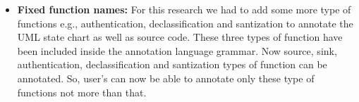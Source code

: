 \begin{itemize}
	\item \textbf{Fixed function names:} For this research we had to add some more type of functions e.g., authentication, declassification and santization to annotate the UML state chart as well as source code. These three types of function have been included inside the annotation language grammar. Now source, sink, authentication, declassification and santization types of function can be annotated. So, user's can now be able to annotate only these type of functions not more than that.
	
\end{itemize}